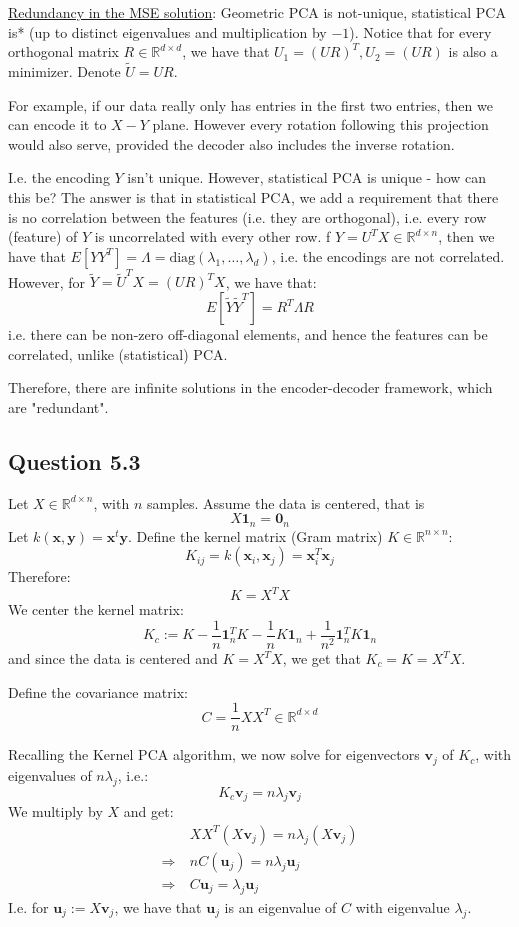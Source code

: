 \documentclass{article}
\begin{document}
\ul{Redundancy in the MSE solution}: Geometric PCA is not-unique, statistical PCA is* (up to distinct eigenvalues and multiplication by $-1$).  Notice that for every orthogonal matrix $R \in \mathbb{R}^{d \times d}$, we have that $U_1 = (UR)^{T}, U_2 = (UR)$ is also a minimizer.  Denote $\widetilde{U}=UR$. 

For example, if our data really only has entries in the first two entries, then we can encode it to $X-Y$ plane. 
However every rotation following this projection would also serve, provided the decoder also includes the inverse rotation. 

I.e. the encoding $Y$ isn't unique.  
However, statistical PCA is unique - how can this be? 
The answer is that in statistical PCA, we add a requirement that there is no correlation between the features (i.e. they are orthogonal), i.e. every row (feature) of $Y$ is uncorrelated with every other row. 
 f $Y = U^{T} X \in \mathbb{R}^{d \times  n}$, then we have that $E[Y Y ^{T}] = \Lambda = \text{diag}(\lambda_1, \ldots, \lambda_{d})$, i.e. the encodings are not correlated. 
However, for $\widetilde{Y} = \widetilde{U}^{T} X = (UR)^{T} X$, we have that:
\[
  E[\widetilde{Y} \widetilde{Y}^{T} ] = R^{T} \Lambda R
\]
i.e. there can be non-zero off-diagonal elements, and hence the features can be  correlated, unlike (statistical) PCA. 

Therefore, there are infinite solutions in the encoder-decoder framework, which are "redundant". 

\subsection*{Question 5.3}
Let $X \in \mathbb{R}^{d \times n}$, with $n$ samples. Assume the data is centered, that is
\[
  X \bm{1}_{n} = \bm{0}_{n}
\]
Let $k(\bm{x},\bm{y}) = \bm{x}^{t} \bm{y}$. Define the kernel matrix (Gram matrix) $K \in \mathbb{R}^{n \times n}$:
\[
  K_{ij} = k(\bm{x}_i, \bm{x}_j) = \bm{x}_i ^{T} \bm{x}_j
\]
Therefore:
\[
  K = X^{T} X
\]
We center the kernel matrix:
\[
  K_{c} := K - \frac{1}{n} \bm{1}_{n} ^{T} K - \frac{1}{n} K \bm{1}_{n} + \frac{1}{n ^2} \bm{1}_{n} ^{T} K \bm{1}_{n}
\]
and since the data is centered and $K = X^{T}X$, we get that $K_{c} =K = X^{T}X$. 

Define the covariance matrix:
\[
  C = \frac{1}{n} X X^{T} \in \mathbb{R}^{d \times d}
\]

Recalling the Kernel PCA algorithm, we now solve for eigenvectors $\bm{v}_{j}$ of $K_{c}$, with eigenvalues of $n \lambda_{j}$, i.e.:
\[
  K_{c} \bm{v}_j = n \lambda_j \bm{v}_j
\]
We multiply by $X$ and get:
\begin{align*}
  & X X ^{T} (X \bm{v}_j) = n \lambda_j (X \bm{v}_j) \\
  \Rightarrow \  & nC (\bm{u}_j)  = n \lambda_j \bm{u}_j \\
  \Rightarrow \ & C \bm{u}_j = \lambda_j \bm{u}_j
\end{align*}
I.e. for $\bm{u}_j := X \bm{v}_j$, we have that $\bm{u}_j$ is an eigenvalue of $C$ with eigenvalue $\lambda_j$. 
\end{document}
